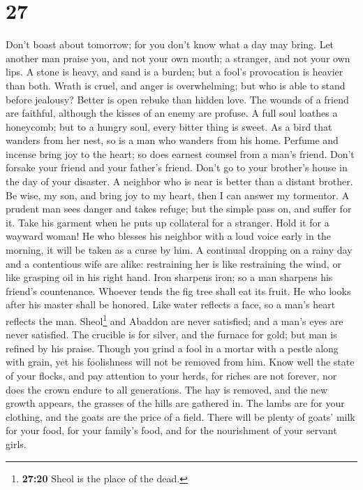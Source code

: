 \hypertarget{section-26}{%
\section{27}\label{section-26}}

 Don't boast about tomorrow; for you don't know what a day
may bring.  Let another man praise you, and not your own
mouth; a stranger, and not your own lips.  A stone is
heavy, and sand is a burden; but a fool's provocation is heavier than
both.  Wrath is cruel, and anger is overwhelming; but who
is able to stand before jealousy?  Better is open rebuke
than hidden love.  The wounds of a friend are faithful,
although the kisses of an enemy are profuse.  A full soul
loathes a honeycomb; but to a hungry soul, every bitter thing is sweet.
 As a bird that wanders from her nest, so is a man who
wanders from his home.  Perfume and incense bring joy to
the heart; so does earnest counsel from a man's friend. 
Don't forsake your friend and your father's friend. Don't go to your
brother's house in the day of your disaster. A neighbor who is near is
better than a distant brother.  Be wise, my son, and
bring joy to my heart, then I can answer my tormentor.  A
prudent man sees danger and takes refuge; but the simple pass on, and
suffer for it.  Take his garment when he puts up
collateral for a stranger. Hold it for a wayward woman! 
He who blesses his neighbor with a loud voice early in the morning, it
will be taken as a curse by him.  A continual dropping on
a rainy day and a contentious wife are alike: 
restraining her is like restraining the wind, or like grasping oil in
his right hand.  Iron sharpens iron; so a man sharpens
his friend's countenance.  Whoever tends the fig tree
shall eat its fruit. He who looks after his master shall be honored.
 Like water reflects a face, so a man's heart reflects
the man.  Sheol\footnote{\textbf{27:20} Sheol is the
  place of the dead.} and Abaddon are never satisfied; and a man's eyes
are never satisfied.  The crucible is for silver, and the
furnace for gold; but man is refined by his praise. 
Though you grind a fool in a mortar with a pestle along with grain, yet
his foolishness will not be removed from him.  Know well
the state of your flocks, and pay attention to your herds,
 for riches are not forever, nor does the crown endure to
all generations.  The hay is removed, and the new growth
appears, the grasses of the hills are gathered in.  The
lambs are for your clothing, and the goats are the price of a field.
 There will be plenty of goats' milk for your food, for
your family's food, and for the nourishment of your servant girls.

